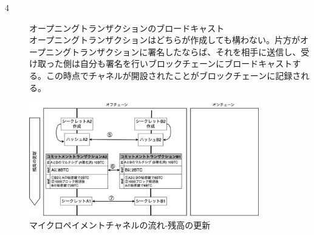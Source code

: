 \documentclass[12pt]{jarticle}
\begin{document}
\begin{itemize}
\begin{description}
\item[4] オープニングトランザクションのブロードキャスト\\
オープニングトランザクションはどちらが作成しても構わない。片方がオープニングトランザクションに署名したならば、それを相手に送信し、受け取った側は自分も署名を行いブロックチェーンにブロードキャストする。この時点でチャネルが開設されたことがブロックチェーンに記録される。
\end{description}
\end{itemize}

\begin{figure}[h]
 \centering
   \includegraphics[width=100mm]{figures/maicrochanelpart2.jpg}
 \caption{マイクロペイメントチャネルの流れ-残高の更新}
 \label{chanel2}
\end{figure}
\end{document}

